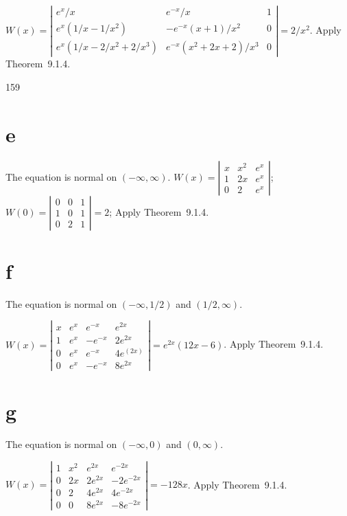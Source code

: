 \documentclass[dvips]{book}
\numberwithin{example}{section}
\numberwithin{equation}{section}
\numberwithin{theorem}{section}
\numberwithin{table}{section}
\numberwithin{figure}{section}
\begin{document}
$W(x)=
\left|\begin{array}{cccc}e^x/x&e^{-x}/x&1\\
e^x(1/x-1/x^2)&-e^{-x}(x+1)/x^2&0\\e^x(1/x-2/x^2
+2/x^3)&e^{-x}(x^2+2x+2)/x^3&0\end{array}\right|=2/x^2$.
Apply  Theorem~9.1.4.

\enlargethispage{1in}
\medskip
\medskip
\centerline{159}
\newpage


\part{e}
The equation is normal on $(-\infty,\infty)$.
$W(x)=
\left|\begin{array}{cccc}x&x^2&e^x\\1&2x&e^x\\0&2&e^x\end{array}\right|$;
$W(0)=
\left|\begin{array}{cccc}0&0&1\\1&0&1\\0&2&1\end{array}\right|=2$;
Apply  Theorem~9.1.4.

\part{f}
The equation is normal on $(-\infty,1/2)$ and $(1/2,\infty)$.

$W(x)=
\left|\begin{array}{cccc}x&e^x&e^{-x}&e^{2x}\\
1&e^x&-e^{-x}&2e^{2x}\\0&e^x&e^{-x}&4e^(
2x)\\0&e^x&-e^{-x}&8e^{2x}\end{array}\right|
=e^{2x}(12x-6)$.
Apply  Theorem~9.1.4.


\part{g}
The equation is normal on $(-\infty,0)$ and $(0,\infty)$.

$W(x)=
\left|\begin{array}{cccc}1&x^2&e^{2x}&e^{-2x}\\
0&2x&2e^{2x}&-2e^{-2x}\\0&2&4e^{2x}&4
e^{-2x}\\0&0&8e^{2x}&-8e^{-2x}\end{array}\right|
=-128x$.
Apply  Theorem~9.1.4.
\end{document}
